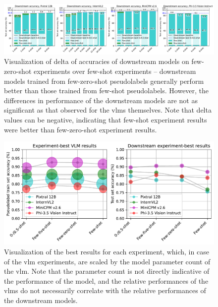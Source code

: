 \documentclass[../ShajiS_RnDReport.tex]{subfiles}
\begin{document}
\begin{figure}[ht]
    \centering
    \includegraphics[width=\linewidth]{figures/cifar_downstream_model_accuracy_delta_few_zero_shot_over_few_shot.pdf}
    \caption{Visualization of delta of accuracies of downstream models on few-zero-shot experiments over few-shot experiments -- downstream models trained from few-zero-shot pseudolabels generally perform better than those trained from few-shot pseudolabels. However, the differences in performance of the downstream models are not as significant as that observed for the \glspl{vlm} themselves. Note that delta values can be negative, indicating that few-shot experiment results were better than few-zero-shot experiment results.}
    \label{fig:cifar_downstream_model_accuracy_delta_few_zero_shot_over_few_shot}
\end{figure}

\begin{figure}[ht]
    \centering
    \includegraphics[width=\linewidth]{figures/cifar_experiment_best_results_scaled_by_model_parameter_count.pdf}
    \caption{Visualization of the best results for each experiment, which, in case of the \gls{vlm} experiments, are scaled by the model parameter count of the \gls{vlm}. Note that the parameter count is not directly indicative of the performance of the model, and the relative performances of the \glspl{vlm} do not necessarily correlate with the relative performances of the downstream models.}
    \label{fig:cifar_experiment_best_results_scaled_by_model_parameter_count}
\end{figure}
\end{document}
